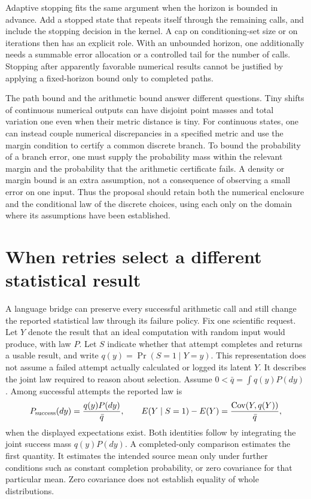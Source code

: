 Adaptive stopping fits the same argument when the horizon is bounded in
advance. Add a stopped state that repeats itself through the remaining calls,
and include the stopping decision in the kernel. A cap on conditioning-set
size or on iterations then has an explicit role. With an unbounded horizon,
one additionally needs a summable error allocation or a controlled tail for
the number of calls. Stopping after apparently favorable numerical results
cannot be justified by applying a fixed-horizon bound only to completed paths.

The path bound and the arithmetic bound answer different questions. Tiny
shifts of continuous numerical outputs can have disjoint point masses and
total variation one even when their metric distance is tiny. For continuous
states, one can instead couple numerical discrepancies in a specified metric
and use the margin condition to certify a common discrete branch. To bound
the probability of a branch error, one must supply the probability mass within
the relevant margin and the probability that the arithmetic certificate fails.
A density or margin bound is an extra assumption, not a consequence of
observing a small error on one input. Thus the proposal should retain both the
numerical enclosure and the conditional law of the discrete choices, using
each only on the domain where its assumptions have been established.

\section{When retries select a different statistical result}
\label{exec17:s9-retry-selection}

A language bridge can preserve every successful arithmetic call and still
change the reported statistical law through its failure policy. Fix one
scientific request. Let $Y$ denote the result that an ideal computation with
random input would produce, with law $P$. Let $S$ indicate whether that attempt
completes and returns a usable result, and write
$q(y)=\Pr(S=1\mid Y=y)$. This representation does not assume a failed
attempt actually calculated or logged its latent $Y$. It describes the joint
law required to reason about selection. Assume $0<\bar q=\int q(y)P(dy)$.
Among successful attempts the reported law is
\begin{equation}
 P_{\rm success}(dy)=\frac{q(y)P(dy)}{\bar q},\qquad
 E(Y\mid S=1)-E(Y)=\frac{\operatorname{Cov}(Y,q(Y))}{\bar q},
 \label{exec17:s9-success-tilt}
\end{equation}
when the displayed expectations exist. Both identities follow by integrating
the joint success mass $q(y)P(dy)$. A completed-only comparison estimates the
first quantity. It estimates the intended source mean only under further
conditions such as constant completion probability, or zero covariance for
that particular mean. Zero covariance does not establish equality of whole
distributions.

